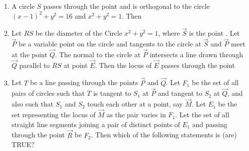 \begin{enumerate}
\hfill{}
\begin{enumerate}
\end{enumerate}
\item A circle $S$ passes through the point  and is orthogonal to the circle $(x-1)^2+y^2=16$ and $x^2+y^2=1$. Then

\hfill {}
\begin{enumerate}
\end{enumerate}
\item Let $RS$ be the diameter of the Circle $x^{2} + y^{2} = 1$,  where $\vec{S}$ is the point . Let $\vec{P}$ be a variable point  on the circle and tangents to the circle at $\vec{S}$ and $\vec{P}$ meet at the point $\vec{Q}$. The normal to the circle at $\vec{P}$ intersects a line drawn through $\vec{Q}$ parallel to $RS$ at point $\vec{E}$. Then the locus of $\vec{E}$ passes through the point

\hfill {}
\begin{enumerate}
\end{enumerate}
\item Let $T$ be a line passing through the points $\vec{P}$ and $\vec{Q}$. Let $F_1$ be the set of all pairs of circles  such that $T$ is tangent to $S_1$ at $\vec{P}$ and tangent to $S_2$ at $\vec{Q}$,  and also such that $S_1$ and $S_2$ touch each other at a point,  say $\vec{M}$. Let $E_1$ be the set representing the locus of $\vec{M}$ as the pair  varies in $F_1$. Let the set of all straight line segments joining a pair of distinct points of $E_1$ and passing through the point $\vec{R}$ be $F_2$. Then which of the following statements is (are) TRUE?


\end{enumerate}
